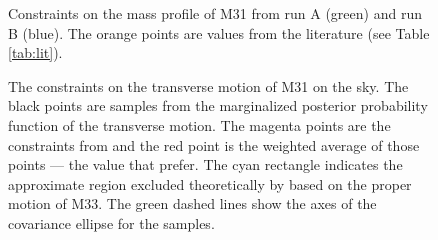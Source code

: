 \documentclass[preprint]{aastex}
\newcommand{\figlabel}[1]{\label{fig:#1}}
\newcommand{\tab}[1]{Table \ref{tab:#1}}
\begin{document}
\begin{figure}[tbp]
    \caption{Constraints on the mass profile of M31 from run A (green) and
    run B (blue). The orange points are values from the literature (see
    \tab{lit}).
    \figlabel{mass-profile}}
\end{figure}

\begin{figure}[tbp]
    \caption{\figlabel{m300}}
\end{figure}

\begin{figure}[tbp]
    \caption{The constraints on the transverse motion of M31 on the sky. The
        black points are samples from the marginalized posterior probability
        function of the transverse motion.
        The magenta points are the constraints from \citet{vdm} and the red
        point is the weighted average of those points --- the value that
        \citet{vdm} prefer. The cyan rectangle indicates the approximate
        region excluded theoretically by \citet{Loeb:2005} based on the
        proper motion of M33. The green dashed lines show the axes of the
        covariance ellipse for the samples. \figlabel{vt}}
\end{figure}





\clearpage
\end{document}
